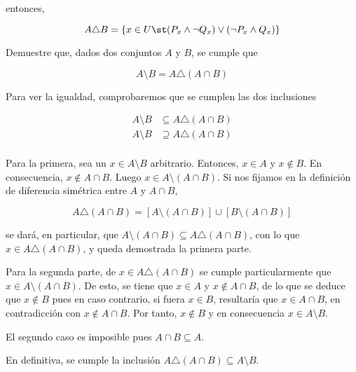 \noindent entonces,

\[ A \triangle B = \{x \in U \st (P_x \land \neg Q_x) \lor (\neg P_x \land
Q_x)\} \]

\begin{exercise}
  Demuestre que, dados dos conjuntos $A$ y $B$, se cumple que

  \[ A \setminus B = A \triangle (A \cap B) \]

  Para ver la igualdad, comprobaremos que se cumplen las dos inclusiones

  \begin{align*}
    A \setminus B &\subseteq A \triangle (A \cap B) \\
    A \setminus B &\supseteq A \triangle (A \cap B) \\
  \end{align*}

  Para la primera, sea un $x \in A \setminus B$ arbitrario. Entonces, $x \in
  A$ y $x \notin B$. En consecuencia, $x \notin A \cap B$. Luego $x \in A
  \setminus (A \cap B)$. Si nos fijamos en la definición de diferencia
  simétrica entre $A$ y $A \cap B$,

  \[ A \triangle (A \cap B) = [A \setminus (A \cap B)] \cup [B \setminus (A
  \cap B)] \]

  \noindent se dará, en particular, que $A \setminus (A \cap B) \subseteq A
  \triangle (A \cap B)$, con lo que $x \in A \triangle (A \cap B)$, y queda
  demostrada la primera parte.


  Para la segunda parte, de $x \in A \triangle (A \cap B)$ se cumple
  particularmente que $x \in A \setminus (A \cap B)$. De esto, se tiene que
  $x \in A$ y $x \notin A \cap B$, de lo que se deduce que $x \notin B$ pues
  en caso contrario, si fuera $x \in B$, resultaría que $x \in A \cap B$, en
  contradicción con $x \notin A \cap B$. Por tanto, $x \notin B$ y en
  consecuencia $x \in A \setminus B$.

  El segundo caso es imposible pues $A \cap B \subseteq A$.

  En definitiva, se cumple la inclusión $A \triangle (A \cap B) \subseteq A
  \setminus B$.
\end{exercise}









